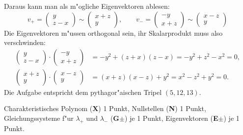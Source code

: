 \begin{diskussion}
\[\]
Daraus kann man als m"ogliche Eigenvektoren ablesen:
\[
v_+=\begin{pmatrix}
y\\z-x
\end{pmatrix}
\sim
\begin{pmatrix}
x+z\\y
\end{pmatrix}
,\qquad
v_-=\begin{pmatrix}
-y\\x+z
\end{pmatrix}
\sim
\begin{pmatrix}
x-z\\y
\end{pmatrix}
\]
Die Eigenvektoren m"ussen orthogonal sein, ihr Skalarprodukt muss also
verschwinden:
\begin{align*}
\begin{pmatrix}
y\\z-x
\end{pmatrix}
\cdot
\begin{pmatrix}
-y\\x+z
\end{pmatrix}
&=
-y^2+(z+x)(z-x)=-y^2+z^2-x^2=0,
\\
\begin{pmatrix}
x+z\\y
\end{pmatrix}
\cdot
\begin{pmatrix}
x-z\\y
\end{pmatrix}
&=
(x+z)(x-z)+y^2=x^2-z^2+y^2=0.
\end{align*}
Die Aufgabe entspricht dem pythagor"aischen Tripel $(5,12,13)$.
\end{diskussion}

\begin{bewertung}
Charakteristisches Polynom ({\bf X}) 1 Punkt,
Nullstellen ({\bf N}) 1 Punkt,
Gleichungssysteme f"ur $\lambda_+$ und $\lambda_-$ ({\bf G$\pm$}) je 1 Punkt,
Eigenvektoren ({\bf E$\pm$}) je 1 Punkt.
\end{bewertung}

